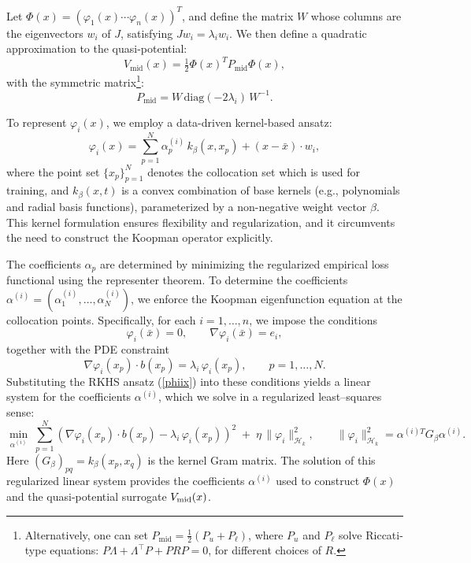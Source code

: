 \documentclass[11pt]{article}
\theoremstyle{plain}      %
\theoremstyle{definition} %
\begin{document}
Let \( \Phi(x) = (\varphi_1(x) \cdots \varphi_n(x))^T \), and define the matrix \( W \) whose columns are the eigenvectors \( w_i \) of \( J \), satisfying \( J w_i = \lambda_i w_i \). We then define a quadratic approximation to the quasi-potential:
\begin{equation} \label{eq:vmid}
V_{\text{mid}}(x) = \tfrac{1}{2} \Phi(x)^T P_{\text{mid}} \Phi(x),
\end{equation}
with the symmetric matrix\footnote{Alternatively, one can set \( P_{\text{mid}} = \frac{1}{2}(P_u + P_\ell) \), where \( P_u \) and \( P_\ell \) solve Riccati-type equations: \( P \Lambda + \Lambda^\top P + PRP = 0 \), for different choices of \( R \).}:
\begin{equation}
P_{\text{mid}} = W\,\mathrm{diag}(-2\lambda_i)\,W^{-1}.
\end{equation}

To represent \( \varphi_i(x) \), we employ a data-driven kernel-based ansatz:
\begin{equation}\label{phiix}
\varphi_i(x) = \sum_{p=1}^N \alpha_p^{(i)}\,k_\beta(x, x_p) + (x - \bar{x}) \cdot w_i,
\end{equation}
where the point set \( \{ x_p \}_{p=1}^N \) denotes the collocation set which is used for training, and \( k_\beta(x, t) \) is a convex combination of base kernels (e.g., polynomials and radial basis functions), parameterized by a non-negative weight vector \( \beta \). This kernel formulation ensures flexibility and regularization, and it circumvents the need to construct the Koopman operator explicitly.

The coefficients $\alpha_p$ are determined by minimizing the regularized empirical loss functional using the representer theorem.   
To determine the coefficients $\alpha^{(i)} = (\alpha^{(i)}_1,\dots,\alpha^{(i)}_N)$,
we enforce the Koopman eigenfunction equation at the collocation points.
Specifically, for each $i=1,\dots,n$, we impose the conditions
\[
\varphi_i(\bar x)=0, \qquad
\nabla\varphi_i(\bar x)=e_i,
\]
together with the PDE constraint
\[
\nabla\varphi_i(x_p)\cdot b(x_p)
= \lambda_i\,\varphi_i(x_p),
\qquad p=1,\dots,N.
\]
Substituting the RKHS ansatz (\ref{phiix}) into these conditions yields a linear
system for the coefficients $\alpha^{(i)}$, which we solve in a
regularized least--squares sense:
\begin{equation}
    \label{eqn:alpha_eqn}
\min_{\alpha^{(i)}} \;
\sum_{p=1}^N 
\left(
\nabla\varphi_i(x_p)\cdot b(x_p)
- \lambda_i\,\varphi_i(x_p)
\right)^2
\;+\;
\eta\,\|\varphi_i\|_{\mathcal{H}_k}^2,
\qquad 
\|\varphi_i\|_{\mathcal H_k}^2
= \alpha^{(i)T} G_\beta \alpha^{(i)}.
\end{equation}
Here $(G_\beta)_{pq}=k_\beta(x_p,x_q)$ is the kernel Gram matrix.
The solution of this regularized linear system provides the coefficients
$\alpha^{(i)}$ used to construct $\Phi(x)$ and the quasi-potential
surrogate $V_{\rm mid}(x)$.
\end{document}
